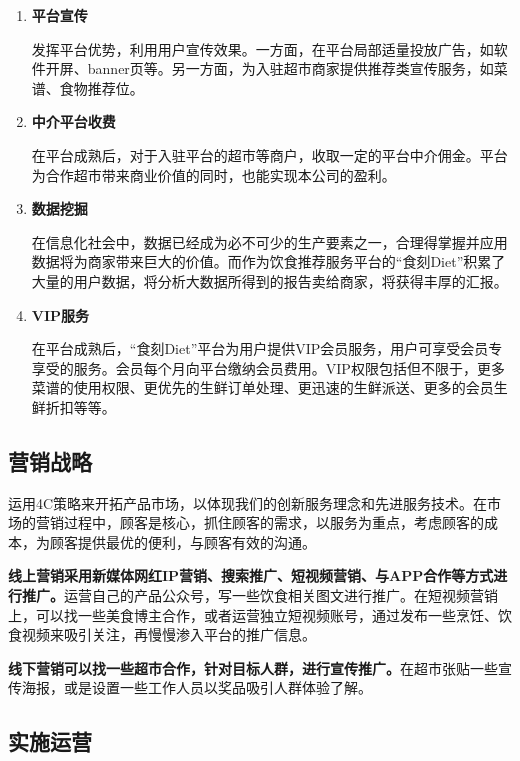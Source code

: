 \documentclass[UTF8,12pt]{ctexart}
\numberwithin{figure}{section}%
\begin{document}
\begin{spacing}{2}
\begin{enumerate}
	\item[(1)] \textbf{平台宣传}
	
	\setlength{\parindent}{2em}发挥平台优势，利用用户宣传效果。一方面，在平台局部适量投放广告，如软件开屏、banner页等。另一方面，为入驻超市商家提供推荐类宣传服务，如菜谱、食物推荐位。
	
	\item[(2)] \textbf{中介平台收费}	
	
	\setlength{\parindent}{2em}在平台成熟后，对于入驻平台的超市等商户，收取一定的平台中介佣金。平台为合作超市带来商业价值的同时，也能实现本公司的盈利。
	
	
	
	\item[(3)] \textbf{数据挖掘}
	
	\setlength{\parindent}{2em}在信息化社会中，数据已经成为必不可少的生产要素之一，合理得掌握并应用数据将为商家带来巨大的价值。而作为饮食推荐服务平台的“食刻Diet”积累了大量的用户数据，将分析大数据所得到的报告卖给商家，将获得丰厚的汇报。
		
	\newpage
	
		
	\item[(4)] \textbf{VIP服务}
		
	\setlength{\parindent}{2em}在平台成熟后，“食刻Diet”平台为用户提供VIP会员服务，用户可享受会员专享受的服务。会员每个月向平台缴纳会员费用。VIP权限包括但不限于，更多菜谱的使用权限、更优先的生鲜订单处理、更迅速的生鲜派送、更多的会员生鲜折扣等等。
\end{enumerate}


\subsection{营销战略}
运用4C策略来开拓产品市场，以体现我们的创新服务理念和先进服务技术。在市场的营销过程中，顾客是核心，抓住顾客的需求，以服务为重点，考虑顾客的成本，为顾客提供最优的便利，与顾客有效的沟通。

\textbf{线上营销采用新媒体网红IP营销、搜索推广、短视频营销、与APP合作等方式进行推广。}运营自己的产品公众号，写一些饮食相关图文进行推广。在短视频营销上，可以找一些美食博主合作，或者运营独立短视频账号，通过发布一些烹饪、饮食视频来吸引关注，再慢慢渗入平台的推广信息。

\textbf{线下营销可以找一些超市合作，针对目标人群，进行宣传推广。}在超市张贴一些宣传海报，或是设置一些工作人员以奖品吸引人群体验了解。

\subsection{实施运营}

\end{spacing}
\end{document}
